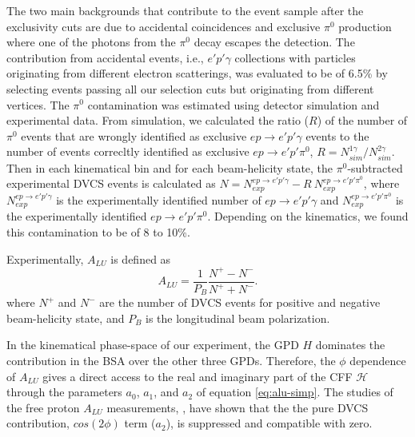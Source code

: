 \documentclass[twocolumn,nofootinbib,showpacs,prl,superscriptaddress,secnumarabic,amssymb,nobibnotes,aps,floatfix]{revtex4}
\begin{document}
The two main backgrounds that contribute to the event sample after the exclusivity cuts are  
due to accidental coincidences and exclusive $\pi^0$ production where one of the photons 
from the $\pi^0$ decay escapes the detection. The contribution from accidental events, i.e., $e'p'\gamma$ collections 
with particles originating from different electron scatterings,
was evaluated to be of 6.5\% by selecting events passing all our selection cuts but originating from 
different vertices. The $\pi^0$ contamination was estimated using detector simulation and experimental 
data. From simulation, we calculated the ratio ($R$) of the number of $\pi^0$ 
events that are wrongly identified as exclusive $ep\rightarrow e'p'\gamma$ events to the 
number of events correcltly identified as exclusive $ep\rightarrow e'p'\pi^0$, 
$R = N^{1\gamma}_{sim}/N^{2\gamma}_{sim}$. Then in each kinematical bin and for 
each beam-helicity state, the $\pi^0$-subtracted experimental DVCS events is 
calculated as $N = N^{ep\rightarrow e'p'\gamma}_{exp}- R~N^{ep\rightarrow 
e'p'\pi^0}_{exp}$, where $N^{ep\rightarrow e'p'\gamma}_{exp}$ is the 
experimentally identified number of $ep\rightarrow e'p'\gamma$ and 
$N^{ep\rightarrow e'p'\pi^0}_{exp}$ is the experimentally identified 
$ep\rightarrow e'p'\pi^0$. Depending on the 
kinematics, we found this contamination to be of 8 to 10\%. 


Experimentally, $A_{LU}$ is defined as
\begin{equation}
A_{LU} = \frac{1}{P_{B}} \frac{N^{+} - N^{-}}{N^{+} + N^{-} }.
\end{equation}
where $N^{+}$ and $N^{-}$ are the number of DVCS events for positive and negative 
beam-helicity state, and $P_{B}$ is the longitudinal beam polarization.  

In the kinematical phase-space of our experiment, the GPD $H$ dominates the 
contribution in the BSA over the other three GPDs. Therefore, 
the $\phi$ dependence of $A_{LU}$ gives a direct access to the real and 
imaginary part of the CFF $\mathcal{H}$ through the parameters $a_0$, $a_1$, 
and $a_2$ of equation \ref{eq:alu-simp}. The studies of  the free proton 
$A_{LU}$ measurements, \cite{Girod:2007aa}, have shown that the the pure DVCS 
contribution, $cos(2\phi)$ term ($a_2$), is suppressed and compatible with 
zero.  

\end{document}
